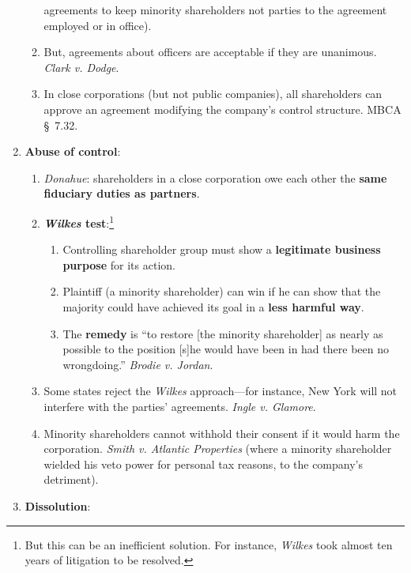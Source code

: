 \begin{enumerate}
\begin{enumerate}
        agreements to keep minority shareholders not parties to the agreement 
        employed or in office).
        \item But, agreements about officers are acceptable if they are 
        unanimous. \emph{Clark v. Dodge}.
        \item In close corporations (but not public companies), all 
        shareholders can approve an agreement modifying the company's control 
        structure. MBCA \S\ 7.32.
    \end{enumerate}
    \item \textbf{Abuse of control}:
    \begin{enumerate}
        \item \emph{Donahue}: shareholders in a close corporation owe each 
        other the \textbf{same fiduciary duties as partners}.
        \item \textbf{\emph{Wilkes} test}:\footnote{But this can be an 
        inefficient solution. For instance, \emph{Wilkes} took almost ten 
        years of litigation to be resolved.}
        \begin{enumerate}
            \item Controlling shareholder group must show a \textbf{legitimate 
            business purpose} for its action.
            \item Plaintiff (a minority shareholder) can win if he can show 
            that the majority could have achieved its goal in a \textbf{less 
            harmful way}.
            \item The \textbf{remedy} is ``to restore [the minority 
            shareholder] as nearly as possible to the position [s]he would 
            have been in had there been no wrongdoing.'' \emph{Brodie v. 
            Jordan}.
        \end{enumerate}
        \item Some states reject the \emph{Wilkes} approach---for instance, 
        New York will not interfere with the parties' agreements. \emph{Ingle 
        v. Glamore}.
        \item Minority shareholders cannot withhold their consent if it would 
        harm the corporation. \emph{Smith v. Atlantic Properties} (where a 
        minority shareholder wielded his veto power for personal tax reasons, 
        to the company's detriment).
    \end{enumerate}
    \item \textbf{Dissolution}:
    \begin{enumerate}

\end{enumerate}
\end{enumerate}
